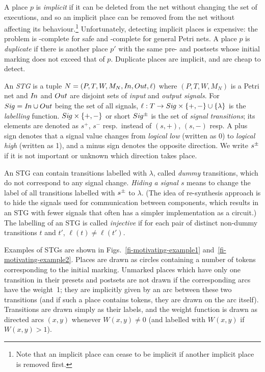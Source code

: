 A place $p$ is \emph{implicit} if it can be deleted from the net
without changing the set of executions, and so an implicit place can be removed from the net without affecting its behaviour.\footnote{Note that an implicit place can cease to be implicit if another implicit place is removed first.}
Unfortunately, detecting
implicit places is expensive: the problem is \PSPACE-complete for safe and \EXPSPACE-complete for general Petri nets. A place $p$ is \emph{duplicate} if there is another place $p'$ with the same pre- and postsets whose initial marking does not exceed that of $p$. Duplicate places are implicit, and are cheap to detect.

\smallskip

An \emph{STG} is a tuple $N=(P,T,W,M_N,\I,\Ot,\ell)$ where
$(P,T,W,M_N)$ is a Petri net and $\I$ and $\Ot$  are disjoint
sets of \emph{input} and  \emph{output signals}. For
$\Sig=\I\cup\Ot$ being the set of all signals,
$\ell:T\rightarrow\Sig\times\{+,-\}\cup \{\lambda\}$ is the
\emph{labelling} function. $\Sig\times\{+,-\}$ or short
$\Sig\upd$ is the set of \emph{signal transitions}; its
elements are denoted  as $s^+$, $s^-$  resp.\ instead of
$(s,+)$, $(s,-)$ resp. A plus sign denotes that a signal value
changes from \emph{logical low} (written as 0) to \emph{logical
high} (written as 1), and a minus sign denotes the opposite
direction. We write $s^\pm$ if it is not important or unknown
which direction takes place.

An STG can contain transitions labelled with $\lambda$, called
\emph{dummy} transitions, which do not correspond to any signal
change. \emph{Hiding a signal $s$} means to change the label of
all transitions labelled with $s^\pm$ to $\lambda$. (The idea
of re-synthesis approach is to hide the signals used for
communication between components, which results in an STG with
fewer signals that often has a simpler implementation as a
circuit.) The labelling of an STG is called \emph{injective} if
for each pair of distinct non-dummy transitions $t$ and $t'$,
$\ell(t)\neq\ell(t')$.

\smallskip

Examples of STGs are shown in Figs.~\ref{fi-motivating-example1} and~\ref{fi-motivating-example2}.
Places are drawn as circles containing a number of tokens corresponding to the initial marking.
Unmarked places which have only one transition in their presets and postsets are
not drawn if the corresponding arcs have the weight~1; they are implicitly
given by an arc between these two transitions (and if such a place contains tokens, they are drawn on the arc itself). Transitions are drawn simply as their labels,
and the weight function is drawn as directed arcs $(x,y)$ whenever $W(x,y)\neq 0$ (and
labelled with $W(x,y)$ if $W(x,y)>1$).


